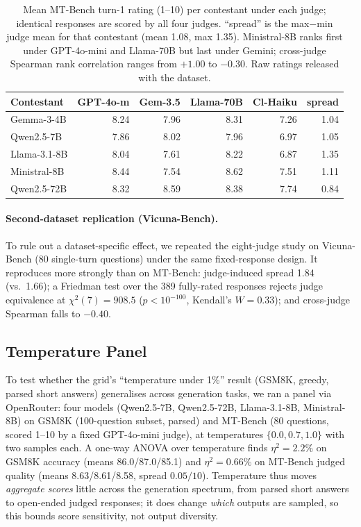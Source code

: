 \documentclass[11pt]{article}
\begin{document}
\begin{table}[ht]
\centering
\small
\setlength{\tabcolsep}{4pt}
\begin{tabular}{lrrrrr}
\toprule
Contestant & GPT-4o-m & Gem-3.5 & Llama-70B & Cl-Haiku & spread \\
\midrule
Gemma-3-4B   & 8.24 & 7.96 & 8.31 & 7.26 & 1.04 \\
Qwen2.5-7B   & 7.86 & 8.02 & 7.96 & 6.97 & 1.05 \\
Llama-3.1-8B & 8.04 & 7.61 & 8.22 & 6.87 & 1.35 \\
Ministral-8B & 8.44 & 7.54 & 8.62 & 7.51 & 1.11 \\
Qwen2.5-72B  & 8.32 & 8.59 & 8.38 & 7.74 & 0.84 \\
\bottomrule
\end{tabular}
\caption{Mean MT-Bench turn-1 rating (1--10) per contestant under each judge;
identical responses are scored by all four judges. ``spread'' is the
max$-$min judge mean for that contestant (mean 1.08, max 1.35). Ministral-8B
ranks first under GPT-4o-mini and Llama-70B but last under Gemini; cross-judge
Spearman rank correlation ranges from $+1.00$ to $-0.30$. Raw ratings released
with the dataset.}
\label{tab:judge-sensitivity}
\end{table}

\paragraph{Second-dataset replication (Vicuna-Bench).} To rule out a dataset-specific
effect, we repeated the eight-judge study on Vicuna-Bench (80 single-turn questions)
under the same fixed-response design. It reproduces more strongly than on MT-Bench:
judge-induced spread 1.84 (vs.\ 1.66); a Friedman test over the 389 fully-rated
responses rejects judge equivalence at $\chi^2(7)=908.5$ ($p<10^{-100}$, Kendall's
$W=0.33$); and cross-judge Spearman falls to $-0.40$.

\subsection{Temperature Panel}
\label{app:exp-temp}
To test whether the grid's ``temperature under 1\%'' result (GSM8K, greedy, parsed
short answers) generalises across generation tasks, we ran a panel via OpenRouter:
four models (Qwen2.5-7B, Qwen2.5-72B, Llama-3.1-8B, Ministral-8B) on GSM8K
(100-question subset, parsed) and MT-Bench (80 questions, scored 1--10 by a fixed
GPT-4o-mini judge), at temperatures $\{0.0, 0.7, 1.0\}$ with two samples each. A
one-way ANOVA over temperature finds $\eta^2 = 2.2\%$ on GSM8K accuracy (means
86.0/87.0/85.1) and $\eta^2 = 0.66\%$ on MT-Bench judged quality (means
8.63/8.61/8.58, spread $0.05/10$). Temperature thus moves \emph{aggregate scores}
little across the generation spectrum, from parsed short answers to open-ended
judged responses; it does change \emph{which} outputs are sampled, so this bounds
score sensitivity, not output diversity.
\end{document}
